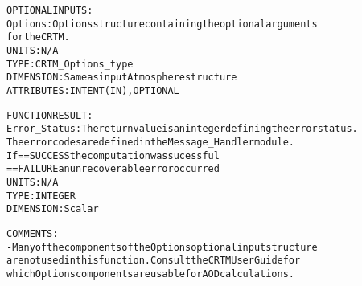 \begin{alltt}
  OPTIONAL INPUTS:
        Options:        Options structure containing the optional arguments
                        for the CRTM.
                        UNITS:      N/A
                        TYPE:       CRTM_Options_type
                        DIMENSION:  Same as input Atmosphere structure
                        ATTRIBUTES: INTENT(IN), OPTIONAL
 
  FUNCTION RESULT:
        Error_Status:   The return value is an integer defining the error status.
                        The error codes are defined in the Message_Handler module.
                        If == SUCCESS the computation was sucessful
                           == FAILURE an unrecoverable error occurred
                        UNITS:      N/A
                        TYPE:       INTEGER
                        DIMENSION:  Scalar
 
  COMMENTS:
        - Many of the components of the Options optional input structure
          are not used in this function. Consult the CRTM User Guide for
          which Options components are usable for AOD calculations.
 
  \end{alltt}
